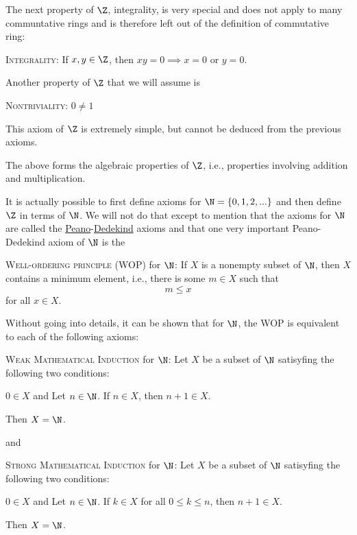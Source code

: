 The next property of $\Z$, integrality,
is very special and does not apply to many
communtative rings and is therefore
left out of the definition of commutative ring:
\begin{enumerate}[nosep]
  \li \textsc{Integrality}:
  If $x, y \in \Z$, then
  $xy = 0 \implies x = 0$ or $y = 0$.
\end{enumerate}
Another property of $\Z$ that we will assume is
\begin{enumerate}[nosep]
  \li \textsc{Nontriviality}:
  $0 \neq 1$
\end{enumerate}
This axiom of $\Z$ is extremely simple, but cannot be deduced from
the previous axioms.

The above forms the algebraic properties of $\Z$, i.e., properties involving
addition and multiplication.

It is actually possible to first define axioms for
$\N = \{0, 1, 2, ...\}$ and then define $\Z$ in terms of $\N$.
We will not do that except to mention that the
axioms for $\N$ are called the
\href{https://en.wikipedia.org/wiki/Giuseppe_Peano}{Peano}-\href{https://en.wikipedia.org/wiki/Richard_Dedekind}{Dedekind} axioms
and that one very important Peano-Dedekind axiom of $\N$ is the
\begin{enumerate}[nosep]
  \li \textsc{Well-ordering principle (WOP)} for $\N$:
  If $X$ is a nonempty subset of $\N$, then $X$ contains a minimum element,
  i.e., there is some $m \in X$ such that
  \[
  m \leq x
  \]
  for all $x \in X$.
\end{enumerate}
Without going into details, it can be shown that for $\N$, the WOP
is equivalent to each of the following axioms:
\begin{enumerate}[nosep]
  \li \textsc{Weak Mathematical Induction} for $\N$:
  Let $X$ be a subset of $\N$ satisyfing the following two conditions:
  \begin{enumerate}[nosep]
    \li $0 \in X$ and
    \li Let $n \in \N$. If $n \in X$, then $n + 1 \in X$.
  \end{enumerate}
  Then $X = \N$.
\end{enumerate}
and
\begin{enumerate}[nosep]
  \li \textsc{Strong Mathematical Induction} for $\N$:
  Let $X$ be a subset of $\N$ satisyfing the following two conditions:
  \begin{enumerate}[nosep]
    \li $0 \in X$ and
    \li Let $n \in \N$. If $k \in X$ for all $0 \leq k \leq n$,
    then $n + 1 \in X$.
  \end{enumerate}
  Then $X = \N$.
\end{enumerate}
  
